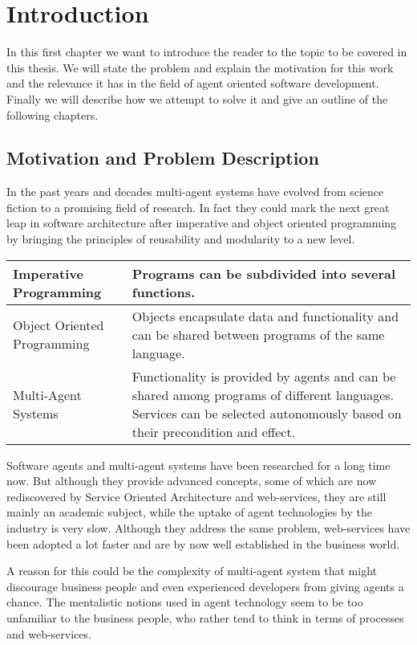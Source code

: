 \chapter{Introduction}

In this first chapter we want to introduce the reader to the topic to be covered in this thesis.
We will state the problem and explain the motivation for this work and the relevance it has in the field of agent oriented software development.
Finally we will describe how we attempt to solve it and give an outline of the following chapters.



\section{Motivation and Problem Description}

In the past years and decades multi-agent systems have evolved from science fiction to a promising field of research. In fact they could mark the next great leap in software architecture after imperative and object oriented programming by bringing the principles of reusability and modularity to a new level.

\begin{tabular}{p{5cm}|p{9cm}}
Imperative Programming &
        Programs can be subdivided into several functions.
\\\hline
Object Oriented Programming &
        Objects encapsulate data and functionality and can be shared between programs of the same language.
\\\hline
Multi-Agent Systems &
        Functionality is provided by agents and can be shared among programs of different languages. Services can be selected autonomously based on their precondition and effect.
\end{tabular}

Software agents and multi-agent systems have been researched for a long time now. But although they provide advanced concepts, some of which are now rediscovered by Service Oriented Architecture and web-services, they are still mainly an academic subject, while the uptake of agent technologies by the industry is very slow. Although they address the same problem, web-services have been adopted a lot faster and are by now well established in the business world.

A reason for this could be the complexity of multi-agent system that might discourage business people and even experienced developers from giving agents a chance. The mentalistic notions used in agent technology seem to be too unfamiliar to the business people, who rather tend to think in terms of processes and web-services.


